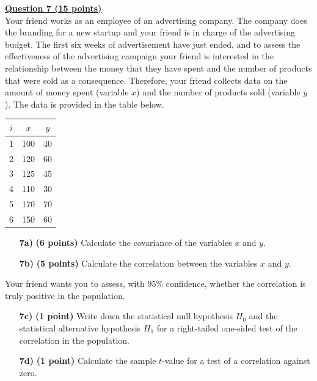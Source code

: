 \underline{\textbf{Question 7 (15 points)}} \\

Your friend works as an employee of an advertising company. The company does the branding for a new startup and your friend is in charge of the advertising budget. The first six weeks of advertisement have just ended, and to assess the effectiveness of the advertising campaign your friend is interested in the relationship between the money that they have spent and the number of products that were sold as a consequence. Therefore, your friend collects data on the amount of money spent (variable $x$) and the number of products sold (variable $y$). The data is provided in the table below. \\

\begin{center}
\begin{tabular}{c|c|c}
     $i$ & $x$ & $y$ \\
     \hline
     1 & 100 & 40 \\
     2 & 120 & 60 \\
     3 & 125 & 45 \\
     4 & 110 & 30 \\ 
     5 & 170 & 70 \\
     6 & 150 & 60
\end{tabular}
\end{center} 

\clearpage %

\begin{itemize}

    \item[\textbf{7a)}] \textbf{(6 points)} Calculate the covariance of the variables $x$ and $y$.
    
    \item[\textbf{7b)}] \textbf{(5 points)} Calculate the correlation between the variables $x$ and $y$.
    
\end{itemize}

Your friend wants you to assess, with 95\% confidence, whether the correlation is truly positive in the population.

\begin{itemize}
    
    \item[\textbf{7c)}] \textbf{(1 point)} Write down the statistical null hypothesis $H_0$ and the statistical alternative hypothesis $H_1$ for a right-tailed one-sided test of the correlation in the population.
    
    \item[\textbf{7d)}] \textbf{(1 point)} Calculate the sample $t$-value for a test of a correlation against zero.
    
\end{itemize}

